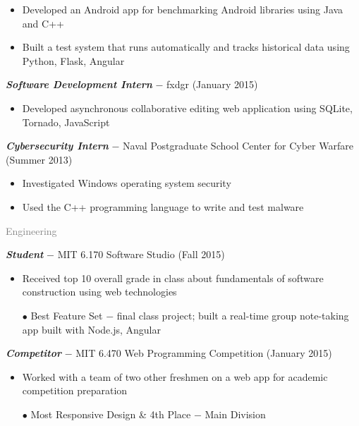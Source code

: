 \documentclass[11pt]{article}
\newcommand{\rsection}[1]{\vspace{1em}\textcolor{gray}{\Large \robotoslab #1}\vspace{0.5em}}
\newcommand{\bt}[1]{\textit{\textbf{#1}}} %
\newcommand{\gap}[0]{\vspace{0.5em}} %
\newcommand{\dash}[0]{ $-$ } %
\begin{document}
\begin{itemize}
\item Developed an Android app for benchmarking Android libraries using Java and C++
\item Built a test system that runs automatically and tracks historical data using Python, Flask, Angular
\end{itemize}

\gap

\bt{Software Development Intern}\dash fxdgr (January 2015)

\begin{itemize}
\item Developed asynchronous collaborative editing web application using SQLite, Tornado, JavaScript
\end{itemize}

\gap

\bt{Cybersecurity Intern}\dash Naval Postgraduate School Center for Cyber Warfare (Summer 2013)

\begin{itemize}
\item Investigated Windows operating system security
\item Used the C++ programming language to write and test malware
\end{itemize}

\rsection{Engineering}

\bt{Student}\dash MIT 6.170 Software Studio (Fall 2015)

\begin{itemize}
\item Received top 10 overall grade in class about fundamentals of software construction using web technologies
\item[$\bullet$] Best Feature Set\dash final class project; built a real-time group note-taking app built with Node.js, Angular
\end{itemize}

\gap

\bt{Competitor}\dash MIT 6.470 Web Programming Competition (January 2015)

\begin{itemize}
\item Worked with a team of two other freshmen on a web app for academic competition preparation
\item[$\bullet$] Most Responsive Design \& 4th Place\dash Main Division
\end{itemize}

\gap
\end{document}

